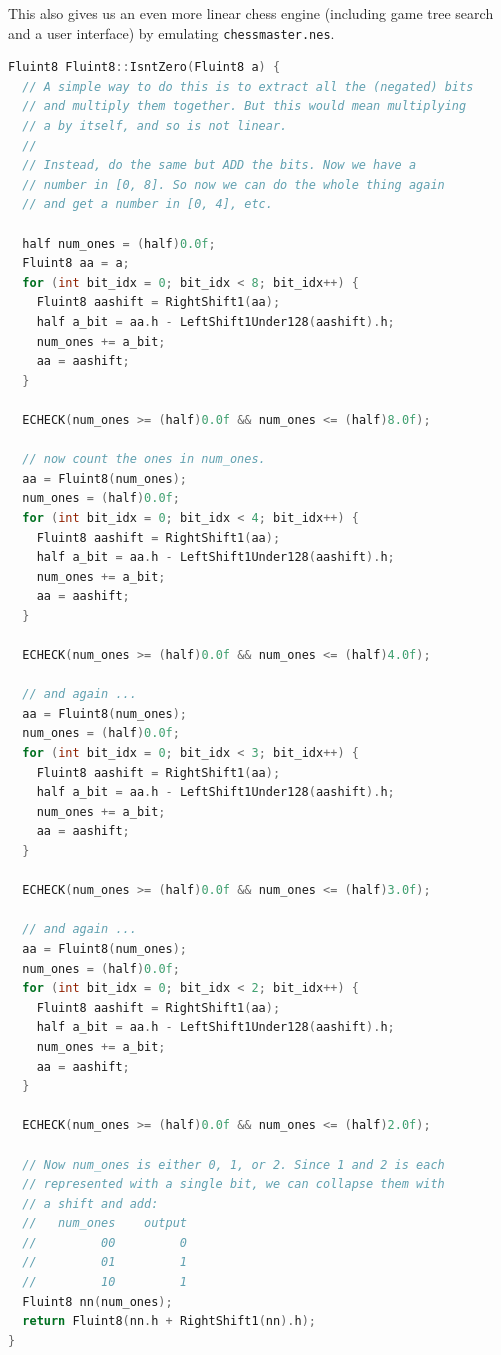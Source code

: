 \documentclass[twocolumn]{article}
\begin{document}
This also gives us an even more linear chess engine (including
game tree search and a user interface) by emulating {\tt chessmaster.nes}.


\begin{lstlisting}[language=C]
Fluint8 Fluint8::IsntZero(Fluint8 a) {
  // A simple way to do this is to extract all the (negated) bits
  // and multiply them together. But this would mean multiplying
  // a by itself, and so is not linear.
  //
  // Instead, do the same but ADD the bits. Now we have a
  // number in [0, 8]. So now we can do the whole thing again
  // and get a number in [0, 4], etc.

  half num_ones = (half)0.0f;
  Fluint8 aa = a;
  for (int bit_idx = 0; bit_idx < 8; bit_idx++) {
    Fluint8 aashift = RightShift1(aa);
    half a_bit = aa.h - LeftShift1Under128(aashift).h;
    num_ones += a_bit;
    aa = aashift;
  }

  ECHECK(num_ones >= (half)0.0f && num_ones <= (half)8.0f);

  // now count the ones in num_ones.
  aa = Fluint8(num_ones);
  num_ones = (half)0.0f;
  for (int bit_idx = 0; bit_idx < 4; bit_idx++) {
    Fluint8 aashift = RightShift1(aa);
    half a_bit = aa.h - LeftShift1Under128(aashift).h;
    num_ones += a_bit;
    aa = aashift;
  }

  ECHECK(num_ones >= (half)0.0f && num_ones <= (half)4.0f);

  // and again ...
  aa = Fluint8(num_ones);
  num_ones = (half)0.0f;
  for (int bit_idx = 0; bit_idx < 3; bit_idx++) {
    Fluint8 aashift = RightShift1(aa);
    half a_bit = aa.h - LeftShift1Under128(aashift).h;
    num_ones += a_bit;
    aa = aashift;
  }

  ECHECK(num_ones >= (half)0.0f && num_ones <= (half)3.0f);

  // and again ...
  aa = Fluint8(num_ones);
  num_ones = (half)0.0f;
  for (int bit_idx = 0; bit_idx < 2; bit_idx++) {
    Fluint8 aashift = RightShift1(aa);
    half a_bit = aa.h - LeftShift1Under128(aashift).h;
    num_ones += a_bit;
    aa = aashift;
  }

  ECHECK(num_ones >= (half)0.0f && num_ones <= (half)2.0f);

  // Now num_ones is either 0, 1, or 2. Since 1 and 2 is each
  // represented with a single bit, we can collapse them with
  // a shift and add:
  //   num_ones    output
  //         00         0
  //         01         1
  //         10         1
  Fluint8 nn(num_ones);
  return Fluint8(nn.h + RightShift1(nn).h);
}


\end{lstlisting}
\end{document}
